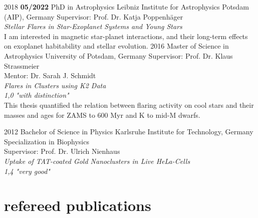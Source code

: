 \documentclass[]{k-cv} %
\begin{document}
\begin{entrylist}
\entry
{2018 \to \textbf{05/2022}}
{PhD {\normalfont in Astrophysics}}
{Leibniz Institute for Astrophysics Potsdam (AIP), Germany}
{Supervisor: Prof. Dr. Katja Poppenh\"ager\\
\emph{Stellar Flares in Star-Exoplanet Systems and Young Stars} \vspace{0.2cm}\\ I am interested in magnetic star-planet interactions, and their long-term effects on exoplanet habitability and stellar evolution.}
\entry
{2016 }
{Master {\normalfont of Science in Astrophysics}}
{University of Potsdam, Germany}
{Supervisor: Prof. Dr. Klaus Strassmeier \\
 Mentor: Dr. Sarah J. Schmidt\\
\emph{Flares in Clusters using K2 Data} \\ 
\emph{1,0 "with distinction"}\vspace{0.2cm}\\
This thesis quantified the relation between flaring activity on cool stars and their masses and ages for ZAMS to 600 Myr and K to mid-M dwarfs.}


\entry
{2012 }
{Bachelor {\normalfont of Science in Physics}}
{Karlsruhe Institute for Technology, Germany}
{Specialization in Biophysics\\
Supervisor: Prof. Dr. Ulrich Nienhaus\\
\emph{Uptake of TAT-coated Gold Nanoclusters in Live HeLa-Cells}\\
\emph{1,4 "very good"}}
\end{entrylist}



\section{refereed publications}
\end{document}
